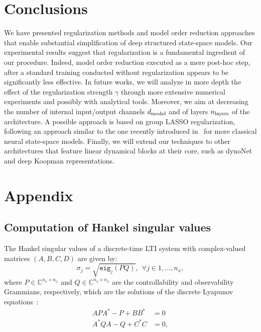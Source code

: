 \documentclass{article} %
\newcommand{\range}[2]{{#1},\ldots, {#2}}
\newcommand{\eig}{\mathtt{eig}}
\newcommand{\nx}{{n_x}}
\begin{document}
\FloatBarrier

\section{Conclusions}
We have presented regularization methods and model order reduction approaches that enable substantial
 simplification of deep structured state-space models. Our experimental results suggest that regularization is a fundamental ingredient of our procedure. Indeed, model order reduction executed  as a mere post-hoc step, after a standard training conducted without regularization appears to be significantly less effective. In future works, we will analyze in more depth the effect of the regularization strength $\gamma$ through more extensive numerical experiments and possibly with analytical tools. Moreover, we aim at decreasing the number of internal input/output channels $d_{\rm model}$ and of layers $n_{\rm layers}$ of the architecture. A possible approach is based on group LASSO regularization, following an approach similar to the one recently introduced in~\cite{bemporad2024linear} for more classical neural state-space models. Finally, we will extend our techniques to other architectures that feature linear dynamical blocks at their core, such as dynoNet and deep Koopman representations.
\appendix
\section{Appendix}
\subsection{Computation of Hankel singular values}
\label{sec:app}
The Hankel singular values of a discrete-time LTI system with complex-valued matrices $(A, B, C, D)$ are given by:
\begin{equation}
\sigma_j = \sqrt{\eig_{j}(PQ)}, \ \ \forall j \in \range{1}{\nx},
\end{equation}
where $P \in \mathbb{C}^{\nx \times \nx}$ and $Q \in \mathbb{C}^{\nx \times \nx}$ are the controllability and observability 
Grammians, respectively, which are the solutions of the discrete Lyapunov equations~\cite{katayama05}:
\begin{align} 
APA^{*} - P + BB^{*} &= 0\\
A^{*}QA - Q + C^{*}C &= 0,
\end{align}
\end{document}
